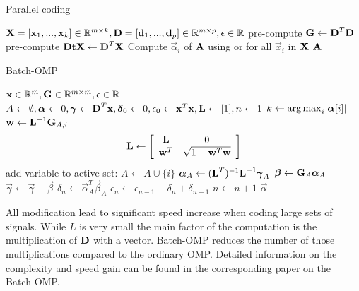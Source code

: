 \begin{algorithm}[h]
\caption{Parallel coding}
\label{alg:parallel}
\begin{algorithmic}[1]
\REQUIRE $\boldsymbol{\mathrm{X}} =[\boldsymbol{\mathrm{x}}_1,...,\boldsymbol{\mathrm{x}}_k]  \in \mathbb{R}^{m \times k},
\boldsymbol{\mathrm{D}} =[\boldsymbol{\mathrm{d}}_1,...,\boldsymbol{\mathrm{d}}_p] \in
\mathbb{R}^{m\times p}, \epsilon \in \mathbb{R}$
\STATE pre-compute $\boldsymbol{\mathrm{G}} \gets \boldsymbol{\mathrm{D}}^T\boldsymbol{\mathrm{D}}$
\STATE pre-compute $\boldsymbol{\mathrm{DtX}} \gets \boldsymbol{\mathrm{D}}^T\boldsymbol{\mathrm{X}}$
\STATE Compute $\vec{\alpha}_i$ of $\boldsymbol{\mathrm{A}}$ using  or
 for all $\vec{x}_i$ in $\boldsymbol{\mathrm{X}}$
\ENDFOR
\RETURN $\boldsymbol{\mathrm{A}}$
\end{algorithmic}
\end{algorithm}

\begin{algorithm}[h]
\caption{Batch-OMP}
\label{alg:batchOMP}
\begin{algorithmic}[1]
\REQUIRE $\boldsymbol{\mathrm{x}} \in \mathbb{R}^{m}, \boldsymbol{\mathrm{G}}  \in
\mathbb{R}^{m\times m}, \epsilon \in \mathbb{R}$
\STATE $A \gets \emptyset,\boldsymbol{\mathrm{\alpha}} \gets 0,\boldsymbol{\mathrm{\gamma}} \gets
\boldsymbol{\mathrm{D}}^T\boldsymbol{\mathrm{x}},\boldsymbol{\mathrm{\delta}}_0 \gets
0, \epsilon_0\gets \boldsymbol{\mathrm{x}}^T\boldsymbol{\mathrm{x}},\boldsymbol{\mathrm{L}}\gets[1],n\gets1$
\STATE $k \gets \operatorname*{arg\,max}_i\lvert \boldsymbol{\mathrm{\alpha}}[i] \rvert$
\STATE $\boldsymbol{\mathrm{w}} \gets \boldsymbol{\mathrm{L}}^{-1}\boldsymbol{\mathrm{G}}_{A,i}$
\STATE
\begin{align}
\boldsymbol{\mathrm{L}} \gets \left[
\begin{array}{ccc}
\boldsymbol{\mathrm{L}} & 0\\
\boldsymbol{\mathrm{w}}^T & \sqrt{1-\boldsymbol{\mathrm{w}}^T\boldsymbol{\mathrm{w}}}
\end{array}
\right]
\end{align}
\ENDIF
\STATE add variable to active set: $A \gets A \cup \{ i\}$
\STATE $\boldsymbol{\mathrm{\alpha}}_A \gets (\boldsymbol{\mathrm{L}}^T)^{-1}\boldsymbol{\mathrm{L}}^{-1}\boldsymbol{\mathrm{\gamma}}_A$
\STATE $\boldsymbol{\mathrm{\beta}} \gets \boldsymbol{\mathrm{G}}_A\boldsymbol{\mathrm{\alpha}}_A$
\STATE $\vec{\gamma} \gets \vec{\gamma}-\vec{\beta}$
\STATE $\delta_{n} \gets \vec{\alpha}_A^T\vec{\beta}_A$
\STATE $\epsilon_n \gets \epsilon_{n-1} - \delta_n + \delta_{n-1}$
\STATE $n \gets n+1$
\ENDWHILE
\RETURN $\vec{\alpha}$
\end{algorithmic}
\end{algorithm}

All modification lead to significant speed increase when coding large sets of
signals. While $L$ is very small the main factor of the computation is
the multiplication of $\boldsymbol{\mathrm{D}}$ with a vector. Batch-OMP reduces the number of
those multiplications compared to the ordinary OMP. Detailed information on the
complexity and speed gain can be found in the corresponding
paper\cite{Rubinstein2008} on the Batch-OMP. 

